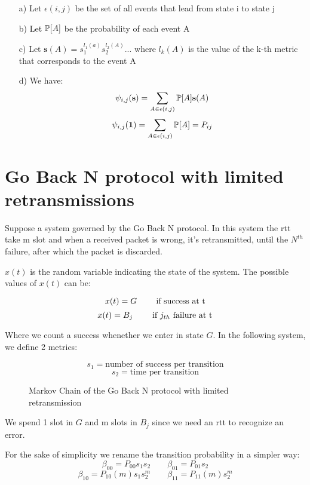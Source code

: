 \begin{enumerate}
		\begin{itemize}
			\item[a)] Let $\epsilon(i,j)$ be the set of all events that lead from state i to state j
			\item[b)] Let $\mathbb{P}[A]$ be the probability of each event A
			\item[c)] Let $\textbf{s}(A) = s_1^{l_1(a)}s_2^{l_2(A)}...$ where $l_k(A)$ is the value of the k-th metric that corresponds to the event A
			\item[d)] We have: $$\psi_{i,j}(\textbf{s}) = \sum_{A \in \epsilon(i,j)} \mathbb{P}[A]\textbf{s}(A)$$
			$$\psi_{i,j}(\mathbf{1}) =\sum_{A \in \epsilon(i,j)} \mathbb{P}[A] = P_{ij}$$
		\end{itemize}
\end{enumerate}


\chapter{Go Back N protocol with limited retransmissions}
Suppose a system governed by the Go Back N protocol.
In this system the \gls{rtt} take m slot and when a received packet is wrong, it's retransmitted, until the $N^{th}$ failure, after which the packet is discarded.

$x(t)$ is the random variable indicating the state of the system. The possible values of $x(t)$ can be:

$$ x(t) = G \text{ \qquad if success at t} $$
$$ x(t) = B_j \text{ \qquad if $j_{th}$ failure at t} $$

Where we count a success whenether we enter in state $G$.
In the following system, we define 2 metrics:

$$s_1 = \text{number of success per transition}$$
$$s_2 = \text{time per transition}$$

\begin{figure}[h]
	\begin{center}
		
	\end{center}
	\caption{Markov Chain of the Go Back N protocol with limited retransmission}
	\label{fig:gbn_mc_complete}
\end{figure}

We spend 1 slot in $G$ and m slots in $B_j$ since we need an \gls{rtt} to recognize an error.

For the sake of simplicity we rename the transition probability in a simpler way:
$$ \beta_{00} = P_{00}s_1s_2 \qquad \beta_{01} = P_{01}s_2$$
$$ \beta_{10} = P_{10}(m)s_1s_2^m \qquad \beta_{11} = P_{11}(m)s_2^m$$

